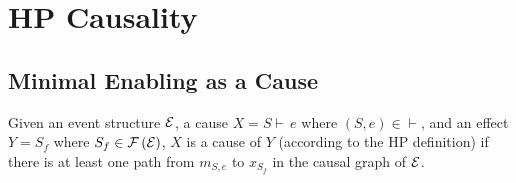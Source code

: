 \section{HP Causality}

\subsection{Minimal Enabling as a Cause}

\begin{thm}\label{thm:hp-x-y}
Given an event structure $\mathcal{E}$, a cause $X = S \vdash\,e$
where $(S, e) \in \vdash$, and an effect $Y = S_f$
where $S_f \in \mathcal{F} \left( \mathcal{E} \right)$, $X$ is a cause of $Y$
(according to the HP definition) if there is at least one path
from $m_{S,e}$ to $x_{S_f}$ in the causal graph of $\mathcal{E}$.
\end{thm}

